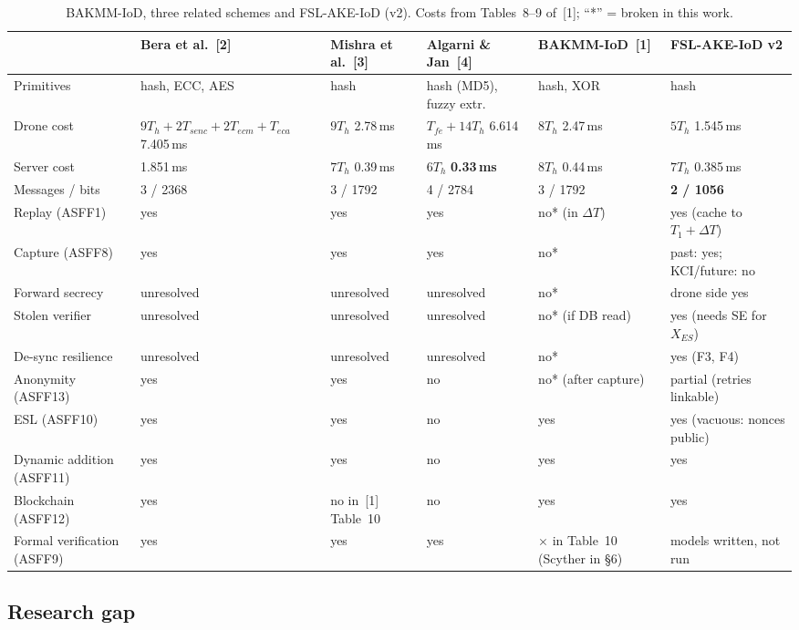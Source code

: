 \begin{table}[ht]
\centering
\caption{BAKMM-IoD, three related schemes and FSL-AKE-IoD (v2). Costs from Tables~8--9 of~[1]; ``*'' = broken in this work.}
\label{tab:w3-related}
\small
\begin{tabular}{p{3.0cm}p{2.1cm}p{2.1cm}p{2.1cm}p{2.1cm}p{2.3cm}}
\toprule
 & Bera et al.~[2] & Mishra et al.~[3] & Algarni \& Jan~[4] & BAKMM-IoD~[1] & FSL-AKE-IoD v2 \\
\midrule
Primitives & hash, ECC, AES & hash & hash (MD5), fuzzy extr. & hash, XOR & hash \\
Drone cost & $9T_h{+}2T_{senc}{+}2T_{ecm}{+}T_{eca}$ 7.405\,ms & $9T_h$ 2.78\,ms & $T_{fe}{+}14T_h$ 6.614\,ms & $8T_h$ 2.47\,ms & $5T_h$ 1.545\,ms \\
Server cost & 1.851\,ms & $7T_h$ 0.39\,ms & $6T_h$ \textbf{0.33\,ms} & $8T_h$ 0.44\,ms & $7T_h$ 0.385\,ms \\
Messages / bits & 3 / 2368 & 3 / 1792 & 4 / 2784 & 3 / 1792 & \textbf{2 / 1056} \\
Replay (ASFF1) & yes & yes & yes & no* (in $\Delta T$) & yes (cache to $T_1{+}\Delta T$) \\
Capture (ASFF8) & yes & yes & yes & no* & past: yes; KCI/future: no \\
Forward secrecy & unresolved & unresolved & unresolved & no* & drone side yes \\
Stolen verifier & unresolved & unresolved & unresolved & no* (if DB read) & yes (needs SE for $X_{ES}$) \\
De-sync resilience & unresolved & unresolved & unresolved & no* & yes (F3, F4) \\
Anonymity (ASFF13) & yes & yes & no & no* (after capture) & partial (retries linkable) \\
ESL (ASFF10) & yes & yes & no & yes & yes (vacuous: nonces public) \\
Dynamic addition (ASFF11) & yes & yes & no & yes & yes \\
Blockchain (ASFF12) & yes & no in~[1] Table~10 & no & yes & yes \\
Formal verification (ASFF9) & yes & yes & yes & $\times$ in Table~10 (Scyther in \S6) & models written, not run \\
\bottomrule
\end{tabular}
\end{table}

\subsection{Research gap}
\label{subsec:w3-gap}

